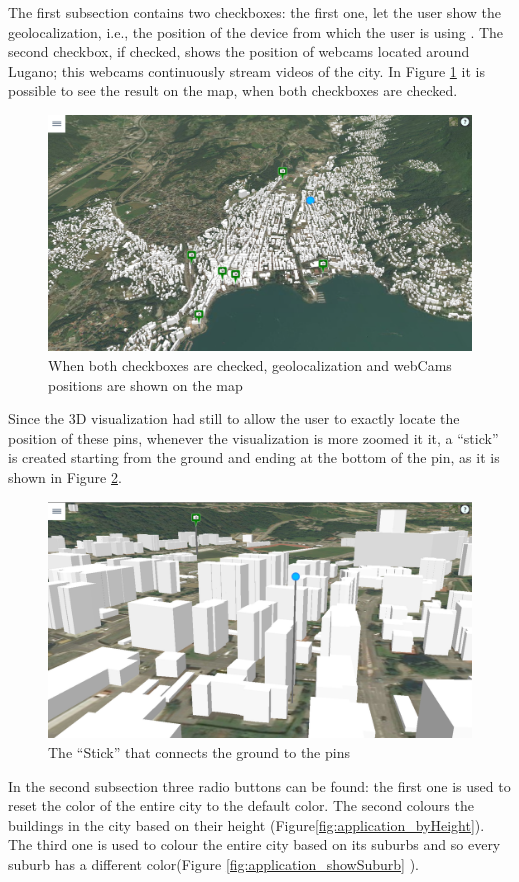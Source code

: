 The first subsection contains two checkboxes: the first one, let the user show the geolocalization, i.e., the position of the device from which the user is using \applicationName. The second checkbox, if checked, shows the position of webcams located around Lugano; this webcams continuously stream videos of the city. In Figure \ref{fig:mapPins} it is possible to see the result on the map, when both checkboxes are checked.
\begin{figure} [H]
\centering
\includegraphics[width=.8\textwidth]{chapter4/images/mapPins}
\caption{When both checkboxes are checked, geolocalization and webCams positions are shown on the map}
\label{fig:mapPins}
\end{figure}
Since the 3D visualization had still to allow the user to exactly locate the position of these pins, whenever the visualization is more zoomed it it, a ``stick'' is created starting from the ground and ending at the bottom of the pin, as it is shown in Figure \ref{fig:3dPins}.\\

\begin{figure} [H]
\centering
\includegraphics[width=.8\textwidth]{chapter4/images/3dPins}
\caption{The ``Stick'' that connects the ground to the pins}
\label{fig:3dPins}
\end{figure}
In the second subsection three radio buttons can be found: the first one is used to reset the color of the entire city to the default color. The second colours the buildings in the city based on their height (Figure\ref{fig:application_byHeight}). The third one is used to colour the entire city based on its suburbs and so every suburb has a different color(Figure \ref{fig:application_showSuburb} ).\\

